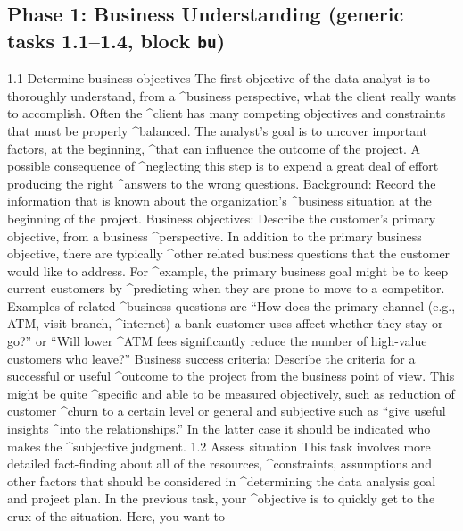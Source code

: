 \subsection*{Phase 1: Business Understanding (generic tasks 1.1--1.4, block \texttt{bu})}
\begin{AppCPrompt}
1.1 Determine business objectives
The first objective of the data analyst is to thoroughly understand, from a
\AppCCont@^business perspective, what the client really wants to accomplish. Often the
\AppCCont@^client has many competing objectives and constraints that must be properly
\AppCCont@^balanced. The analyst’s goal is to uncover important factors, at the beginning,
\AppCCont@^that can influence the outcome of the project. A possible consequence of
\AppCCont@^neglecting this step is to expend a great deal of effort producing the right
\AppCCont@^answers to the wrong questions.
Background: Record the information that is known about the organization’s
\AppCCont@^business situation at the beginning of the project.
Business objectives: Describe the customer’s primary objective, from a business
\AppCCont@^perspective. In addition to the primary business objective, there are typically
\AppCCont@^other related business questions that the customer would like to address. For
\AppCCont@^example, the primary business goal might be to keep current customers by
\AppCCont@^predicting when they are prone to move to a competitor. Examples of related
\AppCCont@^business questions are “How does the primary channel (e.g., ATM, visit branch,
\AppCCont@^internet) a bank customer uses affect whether they stay or go?” or “Will lower
\AppCCont@^ATM fees significantly reduce the number of high-value customers who leave?”
Business success criteria: Describe the criteria for a successful or useful
\AppCCont@^outcome to the project from the business point of view. This might be quite
\AppCCont@^specific and able to be measured objectively, such as reduction of customer
\AppCCont@^churn to a certain level or general and subjective such as “give useful insights
\AppCCont@^into the relationships.” In the latter case it should be indicated who makes the
\AppCCont@^subjective judgment.
1.2 Assess situation
This task involves more detailed fact-finding about all of the resources,
\AppCCont@^constraints, assumptions and other factors that should be considered in
\AppCCont@^determining the data analysis goal and project plan. In the previous task, your
\AppCCont@^objective is to quickly get to the crux of the situation. Here, you want to

\end{AppCPrompt}
